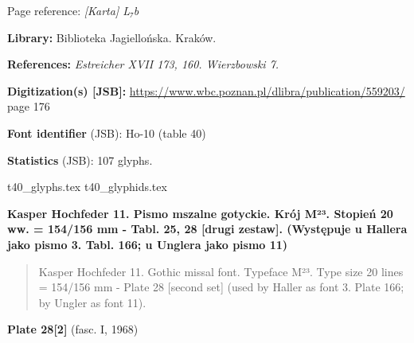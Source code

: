 \documentclass[12pt]{article}
\newcommand{\bg}{\begingl}
\newcommand{\pismoPL}[1]{{\relsize{2}\Junicode\textbf{#1}}}
\newcommand{\pismoEN}[1]{{\relsize{1}\Junicode\begin{quote}#1\end{quote}}}
\newcommand{\plate}[3]{\textbf{Plate #1} (fasc. #2, #3)}
\newcommand{\exampleDig}[1]{{\relsize{0}\Junicode \textbf{Digitization(s) [JSB]:} #1}}
\newcommand{\exampleLib}[1]{{\relsize{0}\Junicode \textbf{Library:} #1}}
\newcommand{\examplePL}[1]{}
\newcommand{\exampleEN}[1]{}
\newcommand{\fontID}[2]{{\relsize{1}\Junicode\textbf{Font identifier} (JSB): #1 (table #2)}}
\newcommand{\fontstat}[1]{{\relsize{1}\Junicode\textbf{Statistics} (JSB): #1 glyphs.}}
\newcommand{\exampleRef}[1]{{\relsize{0}\Junicode \textbf{References:} #1}}
\newcommand{\examplePage}[1]{{Page reference: \relsize{0}\Junicode#1}}
\begin{document}
\medskip
\examplePage{\textit{[Karta] L₇b}}

  \bigskip
\exampleLib{Biblioteka Jagiellońska. Kraków.}


\bigskip
\exampleRef{\textit{Estreicher XVII 173, 160. Wierzbowski 7.}}

\bigskip
\exampleDig{\url{https://www.wbc.poznan.pl/dlibra/publication/559203/}
  page 176}


  
\bigskip

\examplePL{Pismo 10: tekst i pierwszy zestaw. — Pismo 11: nagłówki i
  drugi zestaw, — Rubryka \delta{}: z pismem 11. — Cyfry 4: z pismem
  11}

\medskip

\exampleEN{Font 10: the text and the first font table. — Font 11: the
  headers and the second font table. — Rubric \delta{} with font 11. —
  Digits 4: with font 11}



\bigskip

\fontID{Ho-10}{40}

\fontstat{107}

  {t40_glyphs.tex}
  {t40_glyphids.tex}



 \newpage
 



 \pismoPL{Kasper Hochfeder 11. Pismo mszalne gotyckie. Krój
   M²³. Stopień 20 ww. = 154/156 mm - Tabl. 25, 28 [drugi
   zestaw]. (Występuje u Hallera jako pismo 3. Tabl. 166; u Unglera
   jako pismo 11)}
  
 \pismoEN{Kasper Hochfeder 11. Gothic missal font. Typeface M²³. Type
   size 20 lines = 154/156 mm - Plate 28 [second set] (used by Haller
 as font 3. Plate 166; by Ungler as font 11).}

\plate{28[2]}{I}{1968}
\end{document}
